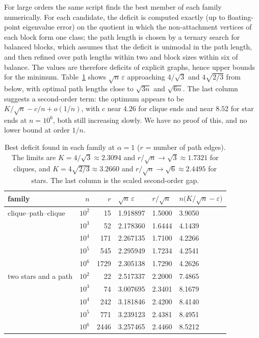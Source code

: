\documentclass[11pt,a4paper]{article}
\theoremstyle{definition}
\newcommand{\eps}{\varepsilon}
\begin{document}
For large orders the same script finds the best member of each family numerically. For each candidate, the deficit is computed exactly (up to floating-point eigenvalue error) on the quotient in which the non-attachment vertices of each block form one class; the path length is chosen by a ternary search for balanced blocks, which assumes that the deficit is unimodal in the path length, and then refined over path lengths within two and block sizes within six of balance. The values are therefore deficits of explicit graphs, hence upper bounds for the minimum. Table~\ref{tab:kpk} shows $\sqrt n\,\eps$ approaching $4/\sqrt3$ and $4\sqrt{2/3}$ from below, with optimal path lengths close to $\sqrt{3n}$ and $\sqrt{6n}$. The last column suggests a second-order term: the optimum appears to be $K/\sqrt n-c/n+o(1/n)$, with $c$ near $4.26$ for clique ends and near $8.52$ for star ends at $n=10^6$, both still increasing slowly. We have no proof of this, and no lower bound at order $1/n$.

\begin{table}[ht]
\centering\small
\begin{tabular}{lrrlll}
\toprule
family & $n$ & $r$ & $\sqrt n\,\eps$ & $r/\sqrt n$ & $n\big(K/\sqrt n-\eps\big)$\\\midrule
clique--path--clique & $10^2$ & 15 & 1.918897 & 1.5000 & 3.9050\\
 & $10^3$ & 52 & 2.178360 & 1.6444 & 4.1439\\
 & $10^4$ & 171 & 2.267135 & 1.7100 & 4.2266\\
 & $10^5$ & 545 & 2.295949 & 1.7234 & 4.2541\\
 & $10^6$ & 1729 & 2.305138 & 1.7290 & 4.2626\\
\midrule
two stars and a path & $10^2$ & 22 & 2.517337 & 2.2000 & 7.4865\\
 & $10^3$ & 74 & 3.007695 & 2.3401 & 8.1679\\
 & $10^4$ & 242 & 3.181846 & 2.4200 & 8.4140\\
 & $10^5$ & 771 & 3.239123 & 2.4381 & 8.4951\\
 & $10^6$ & 2446 & 3.257465 & 2.4460 & 8.5212\\
\bottomrule
\end{tabular}
\caption{Best deficit found in each family at $\alpha=1$ ($r$ = number of path edges). The limits are $K=4/\sqrt3\approx2.3094$ and $r/\sqrt n\to\sqrt3\approx1.7321$ for cliques, and $K=4\sqrt{2/3}\approx3.2660$ and $r/\sqrt n\to\sqrt6\approx2.4495$ for stars. The last column is the scaled second-order gap.}\label{tab:kpk}
\end{table}
\end{document}
